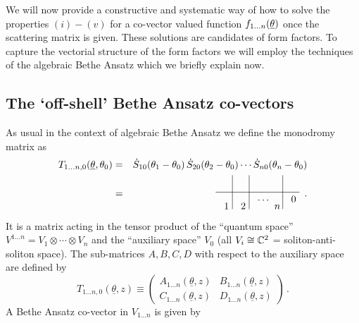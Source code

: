 \documentclass[a4paper,a4paper]{article}
\begin{document}
We will now provide a constructive and systematic way of how to solve the
properties $(i)-(v)$ for a co-vector valued function $f_{1\dots n}({%
\underline{\theta }})$ once the scattering matrix is given. These solutions
are candidates of form factors. To capture the vectorial structure of the
form factors we will employ the techniques of the algebraic Bethe Ansatz
which we briefly explain now.

\subsection{The `off-shell' Bethe Ansatz co-vectors}

As usual in the context of algebraic Bethe Ansatz we define the monodromy
matrix as 
\begin{eqnarray}
T_{1\dots n,0}({\underline{\theta }},\theta _{0}) &=&\dot{S}_{10}(\theta
_{1}-\theta _{0})\,\dot{S}_{20}(\theta _{2}-\theta _{0})\cdots \dot{S}%
_{n0}(\theta _{n}-\theta _{0})  \label{2.1} \\
&=& 
\begin{array}{c}
\unitlength3mm\begin{picture}(10,4) \put(0,2){\line(1,0){10}}
\put(2,0){\line(0,1){4}} \put(4,0){\line(0,1){4}} \put(8,0){\line(0,1){4}}
\put(1,0){$1$} \put(3,0){$ 2$} \put(7,0){$ n$} \put(9,.8){$ 0$}
\put(5,1){$\dots$} \end{picture}
\end{array}
.  \nonumber
\end{eqnarray}
It is a matrix acting in the tensor product of the ``quantum space'' $%
V^{1\dots n}=V_{1}\otimes \cdots \otimes V_{n}$ and the ``auxiliary space'' $%
V_{0}$ (all $V_{i}\cong \Bbb{C}^{2}$ = soliton-anti-soliton space). The
sub-matrices $A,B,C,D$ with respect to the auxiliary space are defined by 
\[
T_{1\dots n,0}({\underline{\theta }},z)\equiv \left( 
\begin{array}{cc}
A_{1\dots n}({\underline{\theta }},z) & B_{1\dots n}({\underline{\theta }},z)
\\ 
C_{1\dots n}({\underline{\theta }},z) & D_{1\dots n}({\underline{\theta }},z)
\end{array}
\right) \,. 
\]
A Bethe Ansatz co-vector in $V_{1\dots n}$ is given by 
\end{document}
